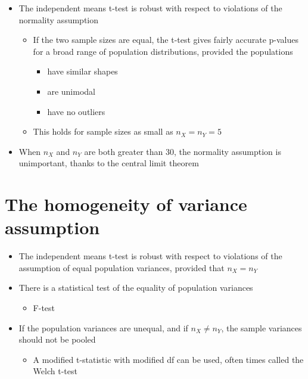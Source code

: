 \documentclass[12pt]{article}
\begin{document}
\begin{itemize}
\itemsep1pt\parskip0pt
\item
  The independent means t-test is robust with respect to violations of
  the normality assumption

  \begin{itemize}
  \itemsep1pt\parskip0pt
  \item
    If the two sample sizes are equal, the t-test gives fairly accurate
    p-values for a broad range of population distributions, provided the
    populations

    \begin{itemize}
    \itemsep1pt\parskip0pt
    \item
      have similar shapes
    \item
      are unimodal
    \item
      have no outliers
    \end{itemize}
  \item
    This holds for sample sizes as small as \(n_{X} = n_{Y} = 5\)
  \end{itemize}
\item
  When \(n_{X}\) and \(n_{Y}\) are both greater than 30, the normality
  assumption is unimportant, thanks to the central limit theorem
\end{itemize}

\section{The homogeneity of variance
assumption}\label{the-homogeneity-of-variance-assumption}

\begin{itemize}
\itemsep1pt\parskip0pt
\item
  The independent means t-test is robust with respect to violations of
  the assumption of equal population variances, provided that
  \(n_{X} = n_{Y}\)
\item
  There is a statistical test of the equality of population variances

  \begin{itemize}
  \itemsep1pt\parskip0pt
  \item
    F-test
  \end{itemize}
\item
  If the population variances are unequal, and if \(n_{X} \neq n_{Y}\),
  the sample variances should not be pooled

  \begin{itemize}
  \itemsep1pt\parskip0pt
  \item
    A modified t-statistic with modified df can be used, often times
    called the Welch t-test
  \end{itemize}
\end{itemize}
\end{document}
